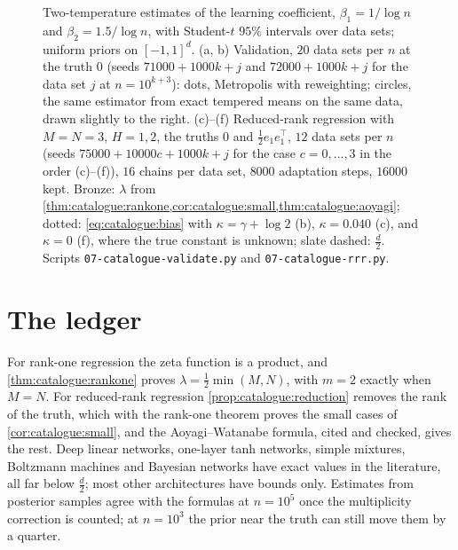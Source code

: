 \begin{refsection}
\begin{figure}[t]
\begin{fullwidth}
\caption{Two-temperature estimates of the learning coefficient, $\beta_1=1/\log n$ and $\beta_2=1.5/\log n$, with Student-$t$ $95\%$ intervals over data sets; uniform priors on $[-1,1]^d$. (a, b) Validation, $20$ data sets per $n$ at the truth $0$ (seeds $71000+1000k+j$ and $72000+1000k+j$ for the data set $j$ at $n=10^{k+3}$): dots, Metropolis with reweighting; circles, the same estimator from exact tempered means on the same data, drawn slightly to the right. (c)--(f) Reduced-rank regression with $M=N=3$, $H=1,2$, the truths $0$ and $\frac12e_1e_1^\top$, $12$ data sets per $n$ (seeds $75000+10000c+1000k+j$ for the case $c=0,\dots,3$ in the order (c)--(f)), $16$ chains per data set, $8000$ adaptation steps, $16000$ kept. Bronze: $\lambda$ from \cref{thm:catalogue:rankone,cor:catalogue:small,thm:catalogue:aoyagi}; dotted: \eqref{eq:catalogue:bias} with $\kappa=\gamma+\log2$ (b), $\kappa=0.040$ (c), and $\kappa=0$ (f), where the true constant is unknown; slate dashed: $\frac d2$. Scripts \texttt{07-catalogue-validate.py} and \texttt{07-catalogue-rrr.py}.}\label{fig:catalogue:rrr}
\end{fullwidth}
\end{figure}

\section{The ledger}\label{sec:catalogue:ledger}

For rank-one regression the zeta function is a product, and \cref{thm:catalogue:rankone} proves $\lambda=\frac12\min(M,N)$, with $m=2$ exactly when $M=N$. For reduced-rank regression \cref{prop:catalogue:reduction} removes the rank of the truth, which with the rank-one theorem proves the small cases of \cref{cor:catalogue:small}, and the Aoyagi--Watanabe formula, cited and checked, gives the rest. Deep linear networks, one-layer tanh networks, simple mixtures, Boltzmann machines and Bayesian networks have exact values in the literature, all far below $\frac d2$; most other architectures have bounds only. Estimates from posterior samples agree with the formulas at $n=10^5$ once the multiplicity correction is counted; at $n=10^3$ the prior near the truth can still move them by a quarter.


\end{refsection}
